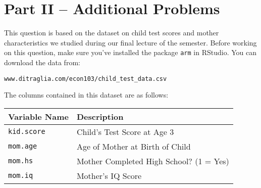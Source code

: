 \documentclass[addpoints,12pt]{exam}\usepackage[]{graphicx}\usepackage[]{color}
\begin{document}
\section*{Part II -- Additional Problems}
\begin{questions}

\question This question is based on the dataset on child test scores and mother characteristics we studied during our final lecture of the semester. Before working on this question, make sure you've installed the package \texttt{arm} in RStudio. You can download the data from: \begin{verbatim}www.ditraglia.com/econ103/child_test_data.csv\end{verbatim}
The columns contained in this dataset are as follows:
\begin{table}[h]
\centering
	\begin{tabular}{ll}
		Variable Name & Description\\
		\hline
		\texttt{kid.score}& Child's Test Score at Age 3\\
		\texttt{mom.age}&Age of Mother at Birth of Child\\
		\texttt{mom.hs}& Mother Completed High School? (1 = Yes)\\
		\texttt{mom.iq}& Mother's IQ Score
	\end{tabular}
\end{table}
	\begin{parts}

\end{parts}
\end{questions}
\end{document}
